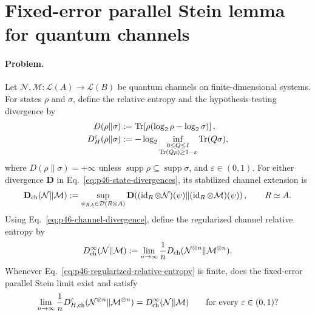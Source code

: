 \section{Fixed-error parallel Stein lemma for quantum channels}
\label{sec:problem-46}

\paragraph{Problem.}
Let $\mathcal N,\mathcal M:\mathcal L(A)\to\mathcal L(B)$ be quantum
channels on finite-dimensional systems.  For states $\rho$ and $\sigma$,
define the relative entropy and the hypothesis-testing divergence by
\begin{equation}
  \begin{aligned}
    D(\rho\|\sigma)
      &:={\rm Tr}\!\left[\rho(\log_2\rho-\log_2\sigma)\right],\\
    D_H^\varepsilon(\rho\|\sigma)
      &:=-\log_2\inf_{\substack{0\leq Q\leq I\\
                    {\rm Tr}(Q\rho)\geq1-\varepsilon}}
                    {\rm Tr}(Q\sigma),
  \end{aligned}
  \label{eq:p46-state-divergences}
\end{equation}
where $D(\rho\|\sigma)=+\infty$ unless
$\operatorname{supp}\rho\subseteq\operatorname{supp}\sigma$, and
$\varepsilon\in(0,1)$.  For either divergence $\mathbf D$ in
Eq.~\eqref{eq:p46-state-divergences}, its stabilized channel extension is
\begin{equation}
  \mathbf D_{\rm ch}(\mathcal N\|\mathcal M)
  :=\sup_{\psi_{RA}\in\mathcal D(R\otimes A)}
  \mathbf D\!\left(
    (\operatorname{id}_R\otimes\mathcal N)(\psi)
    \middle\|
    (\operatorname{id}_R\otimes\mathcal M)(\psi)
  \right),
  \qquad R\simeq A.
  \label{eq:p46-channel-divergence}
\end{equation}
Using Eq.~\eqref{eq:p46-channel-divergence}, define the regularized channel
relative entropy by
\begin{equation}
  D_{\rm ch}^{\infty}(\mathcal N\|\mathcal M)
  :=\lim_{n\to\infty}\frac1n
  D_{\rm ch}(\mathcal N^{\otimes n}\|\mathcal M^{\otimes n}).
  \label{eq:p46-regularized-relative-entropy}
\end{equation}
Whenever Eq.~\eqref{eq:p46-regularized-relative-entropy} is finite, does the
fixed-error parallel Stein limit exist and satisfy
\begin{equation}
  \lim_{n\to\infty}\frac1n
  D_{H,{\rm ch}}^\varepsilon
  (\mathcal N^{\otimes n}\|\mathcal M^{\otimes n})
  =D_{\rm ch}^{\infty}(\mathcal N\|\mathcal M)
  \qquad\text{for every }\varepsilon\in(0,1)?
  \label{eq:p46-fixed-error-stein}
\end{equation}

